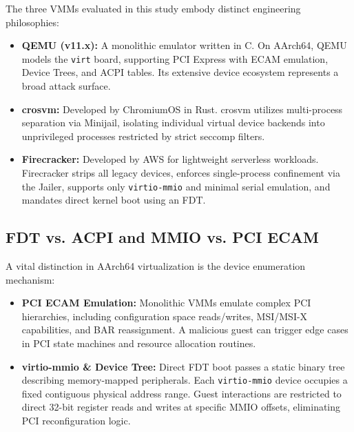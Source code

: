 \documentclass{article}
\begin{document}
The three VMMs evaluated in this study embody distinct engineering philosophies:
\begin{itemize}[leftmargin=*]
    \item \textbf{QEMU (v11.x):} A monolithic emulator written in C. On AArch64, QEMU models the \texttt{virt} board, supporting PCI Express with ECAM emulation, Device Trees, and ACPI tables. Its extensive device ecosystem represents a broad attack surface.
    \item \textbf{crosvm:} Developed by ChromiumOS in Rust. crosvm utilizes multi-process separation via Minijail, isolating individual virtual device backends into unprivileged processes restricted by strict seccomp filters.
    \item \textbf{Firecracker:} Developed by AWS for lightweight serverless workloads. Firecracker strips all legacy devices, enforces single-process confinement via the Jailer, supports only \texttt{virtio-mmio} and minimal serial emulation, and mandates direct kernel boot using an FDT.
\end{itemize}

\subsection{FDT vs. ACPI and MMIO vs. PCI ECAM}\label{sec:fdt_vs_pci}
A vital distinction in AArch64 virtualization is the device enumeration mechanism:
\begin{itemize}[leftmargin=*]
    \item \textbf{PCI ECAM Emulation:} Monolithic VMMs emulate complex PCI hierarchies, including configuration space reads/writes, MSI/MSI-X capabilities, and BAR reassignment. A malicious guest can trigger edge cases in PCI state machines and resource allocation routines.
    \item \textbf{virtio-mmio \& Device Tree:} Direct FDT boot passes a static binary tree describing memory-mapped peripherals. Each \texttt{virtio-mmio} device occupies a fixed contiguous physical address range. Guest interactions are restricted to direct 32-bit register reads and writes at specific MMIO offsets, eliminating PCI reconfiguration logic.
\end{itemize}
\end{document}
